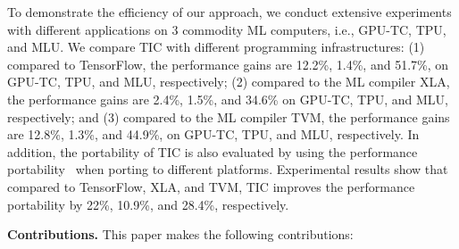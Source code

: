 To demonstrate the efficiency of our approach, we conduct extensive experiments with different applications on $3$ commodity ML computers, i.e., GPU-TC, TPU, and MLU. We compare TIC with different programming infrastructures: %
(1) compared to TensorFlow, the performance gains are 12.2\%, 1.4\%, and 51.7\%, on GPU-TC, TPU, and MLU, respectively; (2) compared to the ML compiler XLA, the performance gains are 2.4\%, 1.5\%, and 34.6\% on GPU-TC, TPU, and MLU, respectively; and (3) compared to the ML compiler TVM, the performance gains are 12.8\%, 1.3\%, and 44.9\%, on GPU-TC, TPU, and MLU, respectively. In addition, the portability of TIC is also evaluated by using the performance portability~\cite{pennycook2019implications} when porting to different platforms. Experimental results show that compared to TensorFlow, XLA, and TVM, TIC improves the performance portability by 22\%, 10.9\%, and 28.4\%, respectively.%





\textbf{Contributions.} This paper makes the following contributions:


